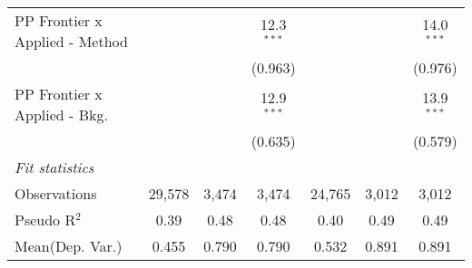 \begin{tabular}{lcccccc}
   PP Frontier x Applied - Method &                &                & 12.3$^{***}$  &                &                & 14.0$^{***}$\\   
                                  &                &                & (0.963)       &                &                & (0.976)\\   
   PP Frontier x Applied - Bkg.   &                &                & 12.9$^{***}$  &                &                & 13.9$^{***}$\\   
                                  &                &                & (0.635)       &                &                & (0.579)\\   
   \midrule
   \emph{Fit statistics}\\
   Observations                   & 29,578         & 3,474          & 3,474         & 24,765         & 3,012          & 3,012\\  
   Pseudo R$^2$                   & 0.39           & 0.48           & 0.48          & 0.40           & 0.49           & 0.49\\  
Mean(Dep. Var.) & 0.455 & 0.790 & 0.790 & 0.532 & 0.891 & 0.891 \\
   

\end{tabular}

